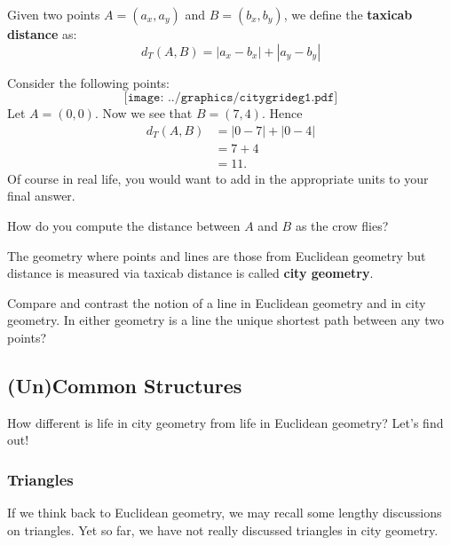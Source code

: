 \begin{definition}Given two points $A = (a_x,a_y)$ and $B = (b_x,b_y)$, we define the
\textbf{taxicab distance} as:
\[
d_T(A,B) = |a_x - b_x| + |a_y - b_y|
\]
\end{definition}


\begin{example} Consider the following points:
\[
\texttt{[image: ../graphics/citygrideg1.pdf]}
\]
Let $A = (0,0)$. Now we see that $B = (7,4)$. Hence
\begin{align*}
d_T(A,B) &= |0 - 7| + |0-4|\\
&= 7 + 4 \\
&= 11.
\end{align*}
Of course in real life, you would want to add in the appropriate units
to your final answer.
\end{example}

\begin{question} How do you compute the distance between $A$ and $B$ as the crow flies?
\end{question}
\QM

\begin{definition}
The geometry where points and lines are those from Euclidean geometry
but distance is measured via taxicab distance is called \textbf{city
  geometry}.
\end{definition}

\begin{question} Compare and contrast the notion of a line in Euclidean geometry and in city geometry. In either geometry is a line the unique shortest path between any two points?
\end{question}
\QM



\subsection{(Un)Common Structures}

How different is life in city geometry from life in Euclidean
geometry? Let's find out!

\subsubsection{Triangles}

If we think back to Euclidean geometry, we
may recall some lengthy discussions on triangles. Yet so far, we have
not really discussed triangles in city geometry.

